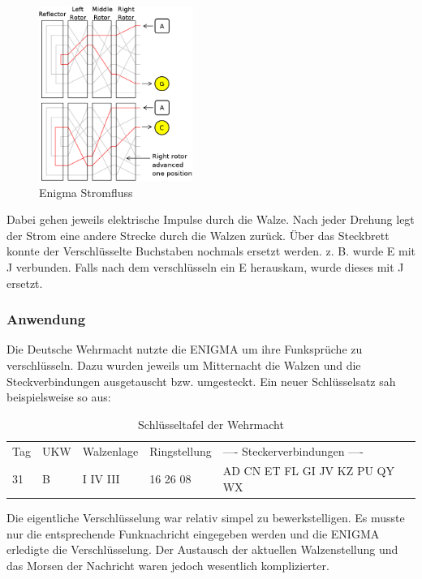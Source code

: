 \begin{figure}[ht]
\begin{center}
\includegraphics[width=5cm]{images/Enigma-action.png}
\caption{Enigma Stromfluss}
\end{center}
\end{figure}

Dabei gehen jeweils elektrische Impulse durch die Walze. Nach jeder Drehung legt der Strom eine andere Strecke durch die Walzen zurück. 
Über das Steckbrett konnte der Verschlüsselte Buchstaben nochmals ersetzt werden. z. B. wurde E mit J verbunden. Falls nach dem verschlüsseln ein E herauskam, wurde dieses mit J ersetzt. 

\subsubsection{Anwendung}
Die Deutsche Wehrmacht nutzte die ENIGMA um ihre Funksprüche zu verschlüsseln. Dazu wurden jeweils um Mitternacht die Walzen und die Steckverbindungen ausgetauscht bzw. umgesteckt. Ein neuer Schlüsselsatz sah beispielsweise so aus:

\begin{table}[ht]
\caption{Schlüsseltafel der Wehrmacht}
\begin{center}
\begin{tabular}{|l|l|l|l|l}
Tag & UKW & Walzenlage & Ringstellung &  ---- Steckerverbindungen ---- \\
 31  &   B   &  I   IV III   &    16 26 08   &  AD CN ET FL GI JV KZ PU QY WX \\
\end{tabular}
\end{center}
\end{table}

Die eigentliche Verschlüsselung war relativ simpel zu bewerkstelligen. Es musste nur die entsprechende Funknachricht eingegeben werden und die ENIGMA erledigte die Verschlüsselung. Der Austausch der aktuellen Walzenstellung und das Morsen der Nachricht waren jedoch wesentlich komplizierter.

